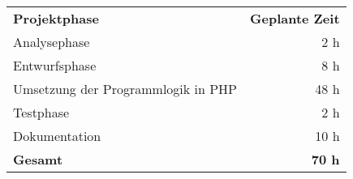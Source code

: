 \begin{tabular}{lr}
\rowcolor{heading}\textbf{Projektphase} & \textbf{Geplante Zeit} \\
Analysephase & 2 h \\
\rowcolor{odd}Entwurfsphase & 8 h \\
Umsetzung der Programmlogik in PHP & 48 h \\
Testphase & 2 h \\
\rowcolor{odd}Dokumentation & 10 h \\
\hline
\hline
\rowcolor{odd}\textbf{Gesamt} & \textbf{70 h} \\
\end{tabular}
